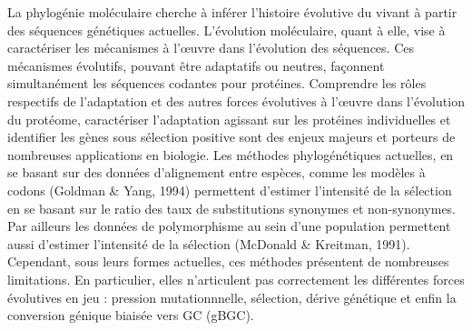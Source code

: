 La phylogénie moléculaire cherche à inférer l’histoire évolutive du vivant à partir des séquences génétiques actuelles.
L'évolution moléculaire, quant à elle, vise à caractériser les mécanismes à l’œuvre dans l'évolution des séquences.
Ces mécanismes évolutifs, pouvant être adaptatifs ou neutres, façonnent simultanément les séquences codantes pour protéines.
Comprendre les rôles respectifs de l'adaptation et des autres forces évolutives à l’œuvre dans l'évolution du protéome, caractériser l'adaptation agissant sur les protéines individuelles et identifier les gènes sous sélection positive sont des enjeux majeurs et porteurs de nombreuses applications en biologie.
Les méthodes phylogénétiques actuelles, en se basant sur des données d'alignement entre espèces, comme les modèles à codons (Goldman \& Yang, 1994) permettent d'estimer l'intensité de la sélection en se basant sur le ratio des taux de substitutions synonymes et non-synonymes.
Par ailleurs les données de polymorphisme au sein d'une population permettent aussi d'estimer l'intensité de la sélection (McDonald \& Kreitman, 1991).
Cependant, sous leurs formes actuelles, ces méthodes présentent de nombreuses limitations.
En particulier, elles n'articulent pas correctement les différentes forces évolutives en jeu : pression mutationnnelle, sélection, dérive génétique et enfin la conversion génique biaisée vers GC (gBGC).


